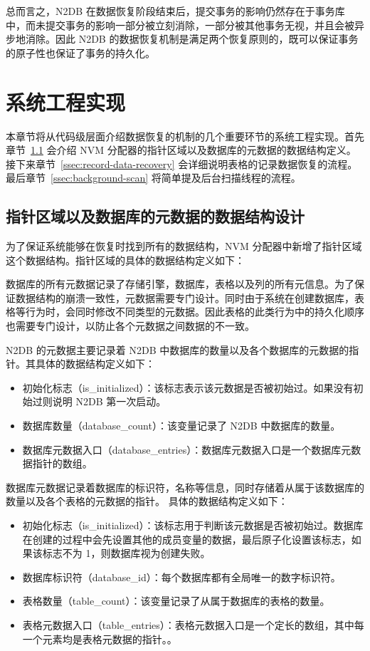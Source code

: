总而言之，N2DB 在数据恢复阶段结束后，提交事务的影响仍然存在于事务库中，而未提交事务的影响一部分被立刻消除，一部分被其他事务无视，并且会被异步地消除。因此 N2DB 的数据恢复机制是满足两个恢复原则的，既可以保证事务的原子性也保证了事务的持久化。

\section{系统工程实现}

本章节将从代码级层面介绍数据恢复的机制的几个重要环节的系统工程实现。首先章节~\ref{ssec:data-structure-recovery} 会介绍 NVM 分配器的指针区域以及数据库的元数据的数据结构定义。接下来章节~\ref{ssec:record-data-recovery} 会详细说明表格的记录数据恢复的流程。最后章节~\ref{ssec:background-scan} 将简单提及后台扫描线程的流程。

\subsection{指针区域以及数据库的元数据的数据结构设计}
\label{ssec:data-structure-recovery}

为了保证系统能够在恢复时找到所有的数据结构，NVM 分配器中新增了指针区域这个数据结构。指针区域的具体的数据结构定义如下：


数据库的所有元数据记录了存储引擎，数据库，表格以及列的所有元信息。为了保证数据结构的崩溃一致性，元数据需要专门设计。同时由于系统在创建数据库，表格等行为时，会同时修改不同类型的元数据。因此表格的此类行为中的持久化顺序也需要专门设计，以防止各个元数据之间数据的不一致。

N2DB 的元数据主要记录着 N2DB 中数据库的数量以及各个数据库的元数据的指针。其具体的数据结构定义如下：
\begin{itemize}
    \item 初始化标志（is\_initialized）：该标志表示该元数据是否被初始过。如果没有初始过则说明 N2DB 第一次启动。
    \item 数据库数量（database\_count）：该变量记录了 N2DB 中数据库的数量。
    \item 数据库元数据入口（database\_entries）：数据库元数据入口是一个数据库元数据指针的数组。
\end{itemize}

数据库元数据记录着数据库的标识符，名称等信息，同时存储着从属于该数据库的数量以及各个表格的元数据的指针。
具体的数据结构定义如下：
\begin{itemize}
    \item 初始化标志（is\_initialized）：该标志用于判断该元数据是否被初始过。数据库在创建的过程中会先设置其他的成员变量的数据，最后原子化设置该标志，如果该标志不为 1，则数据库视为创建失败。
    \item 数据库标识符（database\_id）：每个数据库都有全局唯一的数字标识符。
    \item 表格数量（table\_count）：该变量记录了从属于数据库的表格的数量。
    \item 表格元数据入口（table\_entries）：表格元数据入口是一个定长的数组，其中每一个元素均是表格元数据的指针。。
\end{itemize}

